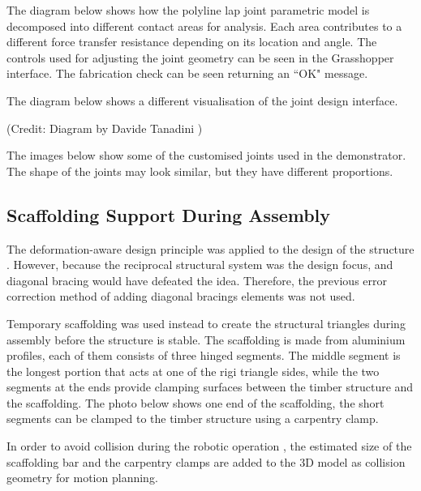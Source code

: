 The diagram below shows how the polyline lap joint parametric model is decomposed into different contact areas for analysis. Each area contributes to a different force transfer resistance depending on its location and angle. The controls used for adjusting the joint geometry can be seen in the Grasshopper interface. The fabrication check can be seen returning an ``OK" message.




The diagram below shows a different visualisation of the joint design interface. 



{\footnotesize (Credit: Diagram by Davide Tanadini \parencite{tanadiniLimitAnalysisTimber2023})}

The images below show some of the customised joints used in the demonstrator. The shape of the joints may look similar, but they have different proportions. 




\subsection{Scaffolding Support During Assembly}
\label{subsection:exploration-5-scaffolding-support-during-assembly}

The deformation-aware design principle was applied to the design of the structure . However, because the reciprocal structural system was the design focus, and diagonal bracing would have defeated the idea. Therefore, the previous error correction method of adding diagonal bracings elements was not used.

Temporary scaffolding was used instead to create the structural triangles during assembly before the structure is stable. The scaffolding is made from aluminium profiles, each of them consists of three hinged segments. The middle segment is the longest portion that acts at one of the rigi triangle sides, while the two segments at the ends provide clamping surfaces between the timber structure and the scaffolding. The photo below shows one end of the scaffolding, the short segments can be clamped to the timber structure using a carpentry clamp.




In order to avoid collision during the robotic operation , the estimated size of the scaffolding bar and the carpentry clamps are added to the 3D model as collision geometry for motion planning.

